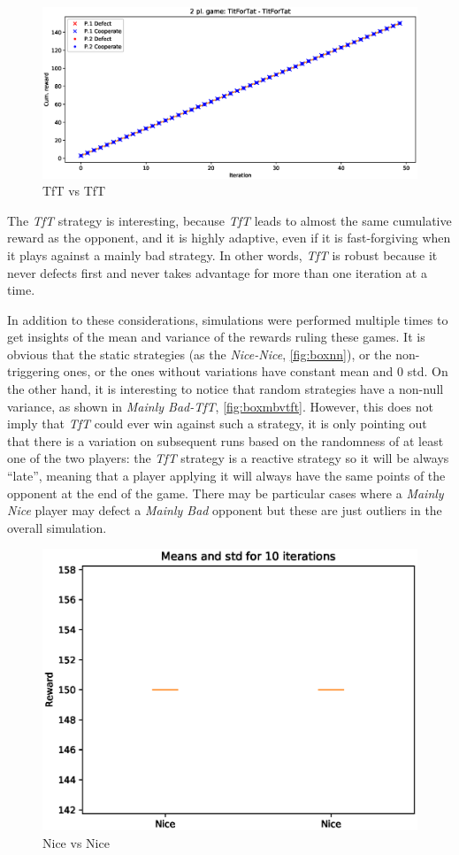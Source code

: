 \documentclass[journal,10pt,twoside]{IEEEtran}
\begin{document}
\begin{figure}[!ht]
    \centering
    \includegraphics[width=.9\columnwidth]{../img/ipd2p/ipd2p-rewards-TitForTat-TitForTat}
    \caption{TfT vs TfT}
    \label{fig:tftvstft}
\end{figure}

The \textit{TfT} strategy is interesting, because \textit{TfT} leads to almost the same cumulative reward as the opponent, and it is highly adaptive, even if it is fast-forgiving when it plays against a mainly bad strategy. In other words, \textit{TfT} is robust because it never defects first and never takes advantage for more than one iteration at a time.~\cite{fogelEvolvingBehaviors}

In addition to these considerations, simulations were performed multiple times to get insights of the mean and variance of the rewards ruling these games. It is obvious that the static strategies (as the \textit{Nice-Nice}, \autoref{fig:boxnn}), or the non-triggering ones, or the ones without variations have constant mean and $0$ std. On the other hand, it is interesting to notice that random strategies have a non-null variance, as shown in \textit{Mainly Bad-TfT}, \autoref{fig:boxmbvtft}. However, this does not imply that \textit{TfT} could ever win against such a strategy, it is only pointing out that there is a variation on subsequent runs based on the randomness of at least one of the two players: the \textit{TfT} strategy is a reactive strategy so it will be always ``late'', meaning that a player applying it will always have the same points of the opponent at the end of the game. There may be particular cases where a \textit{Mainly Nice} player may defect a \textit{Mainly Bad} opponent but these are just outliers in the overall simulation.

\begin{figure}[!ht]
    \centering
    \includegraphics[width=.7\columnwidth]{../img/ipd2p/ipd2p-boxplot-Nice-Nice}
    \caption{Nice vs Nice}
    \label{fig:boxnn}
\end{figure}
\end{document}

